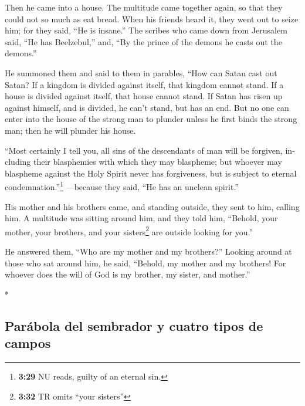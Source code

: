 \begin{paracol}{2}
\begin{otherlanguage}{english}
Then he came into a house.  The multitude came together
again, so that they could not so much as eat bread.  When
his friends heard it, they went out to seize him; for they said, ``He is
insane.''  The scribes who came down from Jerusalem said,
``He has Beelzebul,'' and, ``By the prince of the demons he casts out
the demons.''

 He summoned them and said to them in parables, ``How can
Satan cast out Satan?  If a kingdom is divided against
itself, that kingdom cannot stand.  If a house is divided
against itself, that house cannot stand.  If Satan has
risen up against himself, and is divided, he can't stand, but has an
end.  But no one can enter into the house of the strong
man to plunder unless he first binds the strong man; then he will
plunder his house.

 ``Most certainly I tell you, all sins of the descendants
of man will be forgiven, including their blasphemies with which they may
blaspheme;  but whoever may blaspheme against the Holy
Spirit never has forgiveness, but is subject to eternal
condemnation.''\footnote{\textbf{3:29} NU reads, guilty of an eternal
  sin.}  ---because they said, ``He has an unclean
spirit.''

 His mother and his brothers came, and standing outside,
they sent to him, calling him.  A multitude was sitting
around him, and they told him, ``Behold, your mother, your brothers, and
your sisters\footnote{\textbf{3:32} TR omits ``your sisters''} are
outside looking for you.''

 He answered them, ``Who are my mother and my brothers?''
 Looking around at those who sat around him, he said,
``Behold, my mother and my brothers!  For whoever does
the will of God is my brother, my sister, and mother.''

\end{otherlanguage}

\switchcolumn[0]*

\hypertarget{paruxe1bola-del-sembrador-y-cuatro-tipos-de-campos}{%
\subsection{Parábola del sembrador y cuatro tipos de
campos}\label{paruxe1bola-del-sembrador-y-cuatro-tipos-de-campos}}


\end{paracol}
